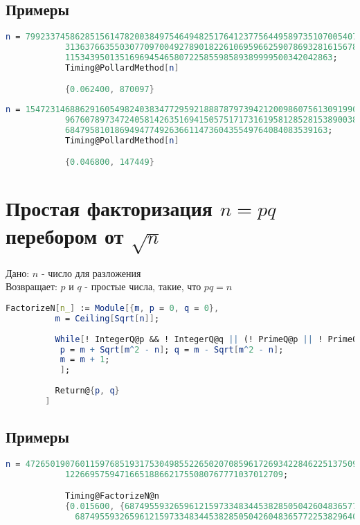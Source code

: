     	\subsection{Примеры}

	    	\begin{lstlisting}[language=Mathematica,caption={
	      		Пример 1
	    	}]
			n = 79923374586285156147820038497546494825176412377564495897351070054076985013\
			313637663550307709700492789018226106959662590786932816156783375519786976435854\
			115343950135169694546580722585598589389999500342042863;
			Timing@PollardMethod[n]

			{0.062400, 870097}
	    	\end{lstlisting}

	    	\begin{lstlisting}[language=Mathematica,caption={
	      		Пример 2
	    	}]
			n = 15472314688629160549824038347729592188878797394212009860756130919909345048\
			967607897347240581426351694150575171731619581285281538900389774463206600132001\
			68479581018694947749263661147360435549764084083539163;
			Timing@PollardMethod[n]

			{0.046800, 147449}
	    	\end{lstlisting}

	\section{Простая факторизация $n = p q$ перебором от $\sqrt{n}$}
		Дано: $n$ - число для разложения\\
		Возвращает: $p$ и $q$ - простые числа, такие, что $p q = n$

		\begin{lstlisting}[language=Mathematica,caption={
      		Факторизация перебором
    	}]
		FactorizeN[n_] := Module[{m, p = 0, q = 0},
		  m = Ceiling[Sqrt[n]];
		  
		  While[! IntegerQ@p && ! IntegerQ@q || (! PrimeQ@p || ! PrimeQ@q),
		   p = m + Sqrt[m^2 - n]; q = m - Sqrt[m^2 - n];
		   m = m + 1;
		   ];
		  
		  Return@{p, q}
		]
    	\end{lstlisting}

    	\subsection{Примеры}

	    	\begin{lstlisting}[language=Mathematica,caption={
	      		Пример 1
	    	}]
			n = 47265019076011597685193175304985522650207085961726934228462251375091225262\
			12266957594716651886621755080767771037012709;

			Timing@FactorizeN@n
			{0.015600, {68749559326596121597334834453828505042604836577225382964179, 
			  68749559326596121597334834453828505042604836577225382964071}}
	    	\end{lstlisting}

